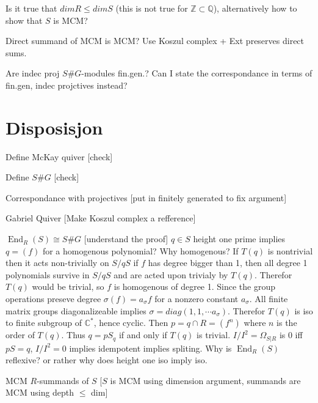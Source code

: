 \documentclass[11pt, a4paper, english]{article}
\numberwithin{prop}{section}
\numberwithin{lemma}{section}
\numberwithin{theorem}{section}
\numberwithin{defin}{section}
\numberwithin{example}{section}
\newcommand{\C}{\mathbb{C}}
\DeclareMathOperator{\End}{End}
\begin{document}
Is it true that $dim R \leq dim S$ (this is not true for $\mathbb{Z} \subset \mathbb{Q}$), alternatively how to show that $S$ is MCM?

Direct summand of MCM is MCM?  Use Koszul complex + Ext preserves direct sums.

Are indec proj $S\#G$-modules fin.gen.? Can I state the correspondance in terms of fin.gen, indec projctives instead?

\section{Disposisjon}
Define McKay quiver [check]

Define $S\#G$ [check]

Correspondance with projectives [put in finitely generated to fix argument]

Gabriel Quiver [Make Koszul complex a refference]

$\End_R(S) \cong S\#G$ [understand the proof]
$q \in S$ height one prime implies $q = (f)$ for a homogenous polynomial? Why homogenous?
If $T(q)$ is nontrivial then it acts non-trivially on $S/qS$ if $f$ has degree bigger than 1, then all degree 1 polynomials survive in $S/qS$ and are acted upon trivialy by $T(q)$. Therefor $T(q)$ would be trivial, so $f$ is homogenous of degree 1.
Since the group operations preseve degree $\sigma(f) = a_\sigma f$ for a nonzero constant $a_\sigma$. All finite matrix groups diagonalizeable implies $\sigma = diag(1,1, \cdots a_\sigma)$. Therefor $T(q)$ is iso to finite subgroup of $\C^*$, hence cyclic.
Then $p=q \cap R = (f^n)$ where $n$ is the order of $T(q)$. Thus $q = pS_q$ if and only if $T(q)$ is trivial.
$I/I^2 = \Omega_{S|R}$ is 0 iff $pS = q$, $I/I^2 = 0$ implies idempotent implies spliting.
Why is $\End_R(S)$ reflexive? or rather why does height one iso imply iso.

MCM $R$-summands of $S$ 
[$S$ is MCM using dimension argument, summands are MCM using depth $\leq$ dim]

\nocite{*}


\end{document}
